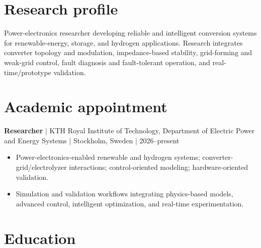 \documentclass[10pt,a4paper]{article}
\begin{document}
\vspace{1pt}

\vspace{1pt}

\vspace{2pt}

\section*{Research profile}

Power-electronics researcher developing reliable and intelligent conversion systems for renewable-energy, storage, and hydrogen applications. Research integrates converter topology and modulation, impedance-based stability, grid-forming and weak-grid control, fault diagnosis and fault-tolerant operation, and real-time/prototype validation.\par

\section*{Academic appointment}

\textbf{Researcher} | KTH Royal Institute of Technology, Department of Electric Power and Energy Systems | Stockholm, Sweden | 2026–present\par

\begin{itemize}\item Power-electronics-enabled renewable and hydrogen systems; converter-grid/electrolyzer interactions; control-oriented modeling; hardware-oriented validation.\end{itemize}

\begin{itemize}\item Simulation and validation workflows integrating physics-based models, advanced control, intelligent optimization, and real-time experimentation.\end{itemize}

\section*{Education}
\end{document}
